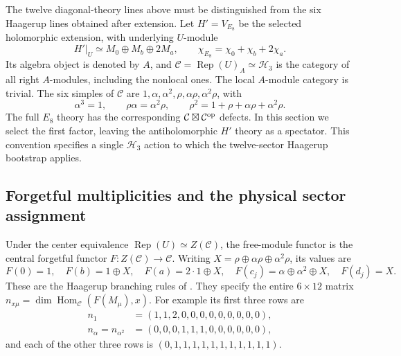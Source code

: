 The twelve diagonal-theory lines above must be distinguished from the
six Haagerup lines obtained after extension. Let
$H'=V_{E_8}$ be the selected holomorphic extension, with underlying
$U$-module
\begin{equation}
 H'\big|_U\simeq M_0\oplus M_b\oplus2M_a,
 \qquad \chi_{E_8}=\chi_0+\chi_b+2\chi_a.
 \label{eq:physics-E8-extension}
\end{equation}
Its algebra object is denoted by $A$, and
$\mathcal C=\operatorname{Rep}(U)_A\simeq\mathcal H_3$ is the
category of all right $A$-modules, including the nonlocal ones.
The local $A$-module category is trivial. The six simples of
$\mathcal C$ are $1,\alpha,\alpha^2,\rho,\alpha\rho,\alpha^2\rho$,
with
\begin{equation}
 \alpha^3=1,\qquad \rho\alpha=\alpha^2\rho,\qquad
 \rho^2=1+\rho+\alpha\rho+\alpha^2\rho.
 \label{eq:physics-H3-ring}
\end{equation}
The full $E_8$ theory has the corresponding
$\mathcal C\boxtimes\mathcal C^{\rm op}$ defects. In this section
we select the first factor, leaving the antiholomorphic $H'$ theory as
a spectator. This convention specifies a single $\mathcal H_3$ action
to which the twelve-sector Haagerup bootstrap applies.

\subsection{Forgetful multiplicities and the physical sector assignment}

Under the center equivalence
$\operatorname{Rep}(U)\simeq Z(\mathcal C)$, the free-module functor
is the central forgetful functor $F:Z(\mathcal C)\to\mathcal C$.
Writing $X=\rho\oplus\alpha\rho\oplus\alpha^2\rho$, its values are
\begin{equation}
 F(0)=1,\quad F(b)=1\oplus X,\quad F(a)=2\cdot1\oplus X,
 \quad F(c_j)=\alpha\oplus\alpha^2\oplus X,
 \quad F(d_j)=X.
 \label{eq:physics-forgetful}
\end{equation}
These are the Haagerup branching rules of
\cite[Eq.~(4.49)]{LOST}. They specify the entire $6\times12$ matrix
$n_{x\mu}=\dim\operatorname{Hom}_{\mathcal C}(F(M_\mu),x)$.
For example its first three rows are
\begin{align}
 n_1&=(1,1,2,0,0,0,0,0,0,0,0,0),\\
 n_\alpha=n_{\alpha^2}&=(0,0,0,1,1,1,0,0,0,0,0,0),
\end{align}
and each of the other three rows is
$(0,1,1,1,1,1,1,1,1,1,1,1)$.

